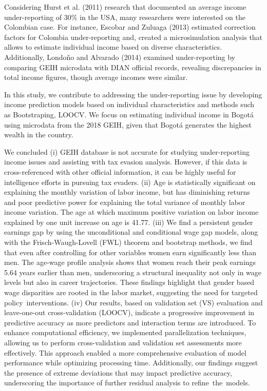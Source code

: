 \documentclass[a4paper,12pt]{article}
\begin{document}
Considering Hurst et al. (2011) research that documented an average income under-reporting of 30$\%$ in the USA, many researchers were interested on the Colombian case. For instance, Escobar and Zuluaga (2013) estimated correction factors for Colombia under-reporting and, created a microsimulation analysis that allows to estimate individual income based on diverse characteristics. Additionally, Londoño and Alvarado (2014) examined under-reporting by comparing GEIH  microdata with DIAN official records, revealing discrepancies in total income figures, though average incomes were similar.

In this study, we contribute to addressing the under-reporting issue by developing income prediction models based on individual characteristics and methods such as Bootstraping, LOOCV. We focus on estimating individual income in Bogotá using microdata from the 2018 GEIH, given that Bogotá generates the highest wealth in the country. 

We concluded (i) GEIH database is not accurate for studying under-reporting income issues and assisting with tax evasion analysis. However, if this data is cross-referenced with other official information, it can be highly useful for intelligence efforts in pursuing tax evaders. (ii) Age is statistically significant on explaining the monthly variation of labor income, but has diminishing returns and poor predictive power for explaining the total variance of monthly labor income variation. The age at which maximum positive variation on labor income explained by one unit increase on age is 41.77. (iii) We find a persistent gender earnings gap by using the unconditional and conditional wage gap models, along with the Frisch-Waugh-Lovell (FWL) theorem and bootstrap methods, we find that even after controlling for other variables women earn significantly less than men. The age-wage profile analysis shows that women reach their peak earnings 5.64 years earlier than men, underscoring a structural inequality not only in wage levels but also in career trajectories. These findings highlight that gender based wage disparities are rooted in the labor market, suggesting the need for targeted policy interventions. (iv) Our results, based on validation set (VS) evaluation and leave-one-out cross-validation (LOOCV), indicate a progressive improvement in predictive accuracy as more predictors and interaction terms are introduced. To enhance computational efficiency, we implemented parallelization techniques, allowing us to perform cross-validation and validation set assessments more effectively. This approach enabled a more comprehensive evaluation of model performance while optimizing processing time. Additionally, our findings suggest the presence of extreme deviations that may impact predictive accuracy, underscoring the importance of further residual analysis to refine the models.
\end{document}
